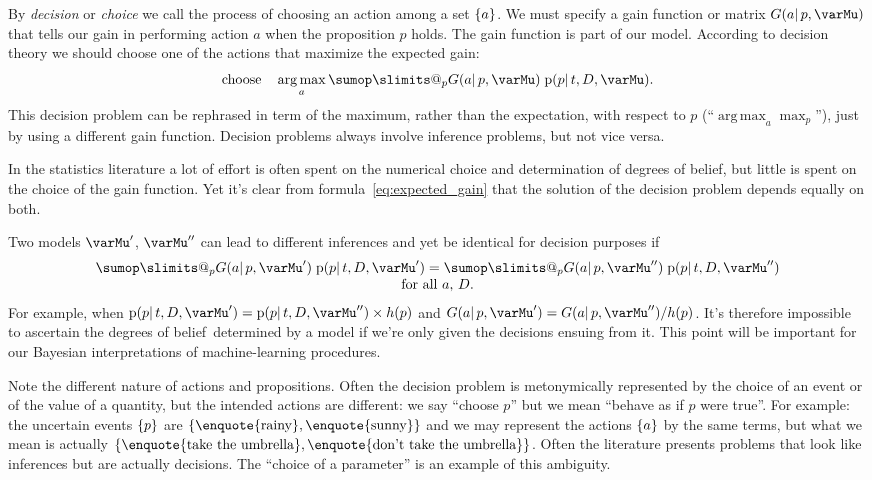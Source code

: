 \documentclass[\ifafour a4paper,12pt,\else a5paper,10pt,\fi%
onecolumn,oneside,article,%
british%
]{memoir}
\makeatletter
\theoremstyle{remark}
\theoremstyle{innote}
\def\sum{\DOTSI\sumop\slimits@}
\newcommand*{\citep}{\parencites}
\DeclarePairedDelimiter\set{\{}{\}}
\newcommand*{\pf}{\mathrm{p}}%
\renewcommand*{\|}{\mathpunct{|}}
\newcommand*{\chap}{ch.}%
\DeclareMathOperator*{\argmax}{arg\,max}
\newcommand*{\dobs}{degrees of belief}
\newcommand*{\yp}{p}
\newcommand*{\ya}{a}
\newcommand*{\yg}{G}
\newcommand*{\yD}{D}
\newcommand*{\yM}{\varMu}
\makeatother
\begin{document}
By \emph{decision} or \emph{choice} we call the process of choosing an
action among a set $\set{\ya}$. We must specify a gain function or matrix
$\yg(\ya \| \yp, \yM)$ that tells our gain in performing action $\ya$ when
the proposition $\yp$ holds. The gain function is part of our model.
According to decision theory
\citep{raiffaetal1961_r2000}[\chap~13]{jaynes1994_r2003} we should choose
one of the actions that maximize the expected gain:
\begin{equation}
  \label{eq:expected_gain}
  \text{choose}\quad
  \argmax_{\ya} \sum_{\yp} \yg(\ya \| \yp, \yM)\; \pf(\yp \| t, \yD, \yM).
\end{equation}
This decision problem can be rephrased in term of the maximum, rather than
the expectation, with respect to $\yp$
(\enquote{$\argmax_{\ya}\max_{\yp}$}), just by using a different gain
function. Decision problems always involve inference problems, but not vice
versa.

In the statistics literature a lot of effort is often spent on the
numerical choice and determination of \dobs, but little is spent on the
choice of the gain function. Yet it's clear from
formula~\eqref{eq:expected_gain} that the solution of the decision problem
depends equally on both.

Two models $\yM'$, $\yM''$ can lead to different inferences and yet be
identical for decision purposes if
\begin{multline}
  \label{eq:equivalent_decision_models}
  \sum_{\yp} \yg(\ya \| \yp, \yM')\; \pf(\yp \|t, \yD, \yM')
  =
  \sum_{\yp} \yg(\ya \| \yp, \yM'')\; \pf(\yp \|t, \yD, \yM'')
\\[-\jot]\text{for all $\ya$, $\yD$}.
\end{multline}
For example, when
$\pf(\yp \|t, \yD, \yM') = \pf(\yp \|t, \yD, \yM'')\times h(\yp)$ and
$\yg(\ya \| \yp, \yM') = \yg(\ya \| \yp, \yM'')/h(\yp)$. It's therefore
impossible to ascertain the \dobs\ determined by a model if we're only
given the decisions ensuing from it. This point will be important for our
Bayesian interpretations of machine-learning procedures.

Note the different nature of actions and propositions. Often the decision
problem is metonymically represented by the choice of an event or of the
value of a quantity, but the intended actions are different: we say
\enquote{choose $\yp$} but we mean \enquote{behave as if $\yp$ were true}.
For example: the uncertain events $\set{\yp}$ are
$\set{\text{\enquote{rainy}}, \text{\enquote{sunny}}}$ and we may represent
the actions $\set{\ya}$ by the same terms, but what we mean is actually
$\set{\text{\enquote{take the umbrella}}, \text{\enquote{don't take the
      umbrella}}}$. Often the literature presents problems that look like
inferences but are actually decisions. The \enquote{choice of a parameter}
is an example of this ambiguity.
\end{document}

